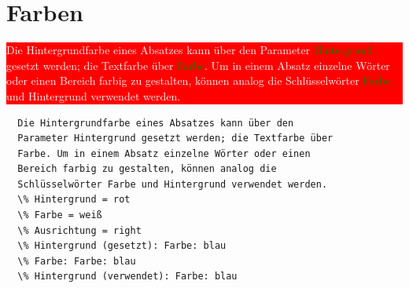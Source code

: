 \documentclass{scrartcl}
\begin{document}
\section{Farben}

\colorbox{red}{\parbox{\linewidth}{%
\textcolor{white}{%
Die Hintergrundfarbe eines Absatzes kann über den Parameter \textcolor{green}{Hintergrund} gesetzt werden; die Textfarbe über \textcolor{green}{Farbe}. Um in einem Absatz einzelne Wörter oder einen Bereich farbig zu gestalten, können analog die Schlüsselwörter \textcolor{green}{Farbe} und \textcolor{PaleTurquoise1}{Hintergrund} verwendet werden.
}}
}

\begin{verbatim}
  Die Hintergrundfarbe eines Absatzes kann über den
  Parameter Hintergrund gesetzt werden; die Textfarbe über
  Farbe. Um in einem Absatz einzelne Wörter oder einen
  Bereich farbig zu gestalten, können analog die
  Schlüsselwörter Farbe und Hintergrund verwendet werden.
  \% Hintergrund = rot
  \% Farbe = weiß
  \% Ausrichtung = right
  \% Hintergrund (gesetzt): Farbe: blau
  \% Farbe: Farbe: blau
  \% Hintergrund (verwendet): Farbe: blau

\end{verbatim}
\end{document}
